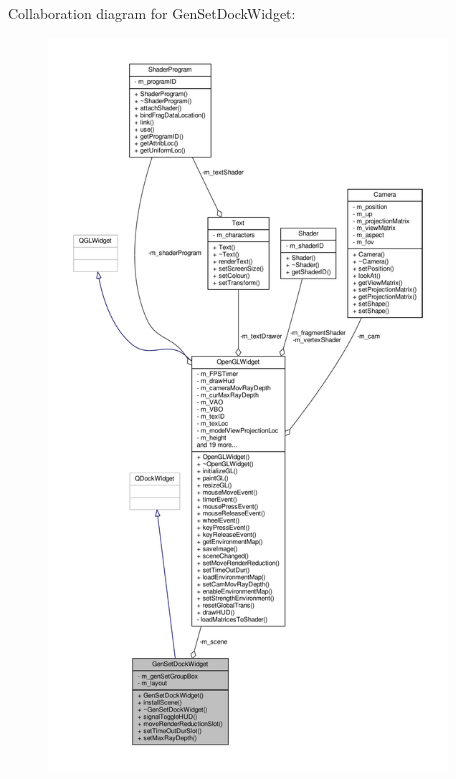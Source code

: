 Collaboration diagram for Gen\-Set\-Dock\-Widget\-:
\nopagebreak
\begin{figure}[H]
\begin{center}
\leavevmode
\includegraphics[height=550pt]{class_gen_set_dock_widget__coll__graph}
\end{center}
\end{figure}
